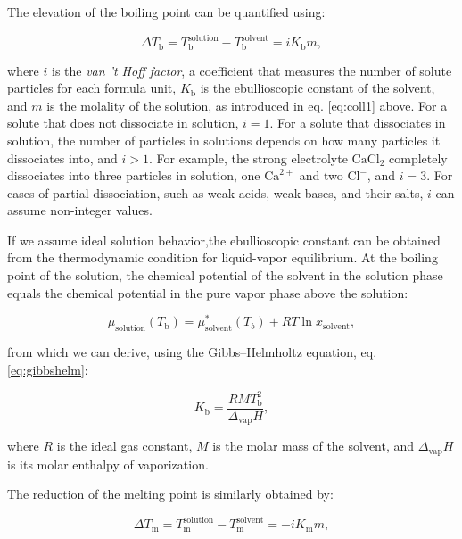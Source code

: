 \documentclass[
  9pt,
]{extbook}
\theoremstyle{definition}
\theoremstyle{definition}
\theoremstyle{definition}
\theoremstyle{definition}
\theoremstyle{remark}
\begin{document}
The elevation of the boiling point can be quantified using:

\begin{equation}
\Delta T_{\text{b}}=T_{\text{b}}^{\text{solution}}-T_{\text{b}}^{\text{solvent}}=iK_{\text{b}}m,
\label{eq:coll3}
\end{equation}

where \(i\) is the \emph{van 't Hoff factor}, a coefficient that measures the number of solute particles for each formula unit, \(K_{\text{b}}\) is the ebullioscopic constant of the solvent, and \(m\) is the molality of the solution, as introduced in eq. \eqref{eq:coll1} above. For a solute that does not dissociate in solution, \(i=1\). For a solute that dissociates in solution, the number of particles in solutions depends on how many particles it dissociates into, and \(i>1\). For example, the strong electrolyte \(\mathrm{Ca}\mathrm{Cl}_2\) completely dissociates into three particles in solution, one \(\mathrm{Ca}^{2+}\) and two \(\mathrm{Cl}^-\), and \(i=3\). For cases of partial dissociation, such as weak acids, weak bases, and their salts, \(i\) can assume non-integer values.

If we assume ideal solution behavior,the ebullioscopic constant can be obtained from the thermodynamic condition for liquid-vapor equilibrium. At the boiling point of the solution, the chemical potential of the solvent in the solution phase equals the chemical potential in the pure vapor phase above the solution:

\begin{equation}
\mu_{\text{solution}} (T_{\text{b}})  = \mu_{\text{solvent}}^*(T_b)  + RT\ln x_{\text{solvent}},
\label{eq:coll4}
\end{equation}

from which we can derive, using the Gibbs--Helmholtz equation, eq. \eqref{eq:gibbshelm}:

\begin{equation}
K_{\text{b}}=\frac{RMT_{\text{b}}^{2}}{\Delta_{\mathrm{vap}} H},
\label{eq:coll5}
\end{equation}

where \(R\) is the ideal gas constant, \(M\) is the molar mass of the solvent, and \(\Delta_{\mathrm{vap}} H\) is its molar enthalpy of vaporization.

The reduction of the melting point is similarly obtained by:

\begin{equation}
\Delta T_{\text{m}}=T_{\text{m}}^{\text{solution}}-T_{\text{m}}^{\text{solvent}}=-iK_{\text{m}}m,
\label{eq:coll6}
\end{equation}
\end{document}
